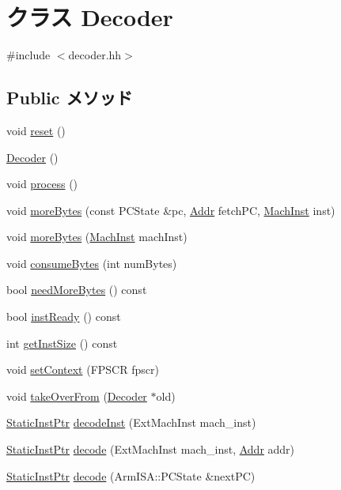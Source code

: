 \hypertarget{classArmISA_1_1Decoder}{
\section{クラス Decoder}
\label{classArmISA_1_1Decoder}
}


{\ttfamily \#include $<$decoder.hh$>$}\subsection*{Public メソッド}
\begin{DoxyCompactItemize}
\item 
void \hyperlink{classArmISA_1_1Decoder_ad20897c5c8bd47f5d4005989bead0e55}{reset} ()
\item 
\hyperlink{classArmISA_1_1Decoder_aedfa2b7d97ed17b14903ed75d6214c78}{Decoder} ()
\item 
void \hyperlink{classArmISA_1_1Decoder_a2e9c5136d19b1a95fc427e0852deab5c}{process} ()
\item 
void \hyperlink{classArmISA_1_1Decoder_a85a99c8dd9425508bee9a17836dbbd12}{moreBytes} (const PCState \&pc, \hyperlink{classm5_1_1params_1_1Addr}{Addr} fetchPC, \hyperlink{namespaceArmISA_a301c22ea09fa33dcfe6ddf22f203699c}{MachInst} inst)
\item 
void \hyperlink{classArmISA_1_1Decoder_ad64ff6faaad6c993e98f9c2bcbf25f0e}{moreBytes} (\hyperlink{namespaceArmISA_a301c22ea09fa33dcfe6ddf22f203699c}{MachInst} machInst)
\item 
void \hyperlink{classArmISA_1_1Decoder_a34f1e4d13220afca8ec5c23596daba7e}{consumeBytes} (int numBytes)
\item 
bool \hyperlink{classArmISA_1_1Decoder_ac858279e4cc89d892ea4cb6b42853d88}{needMoreBytes} () const 
\item 
bool \hyperlink{classArmISA_1_1Decoder_aff34b6a32f7726d46b66dd672105c900}{instReady} () const 
\item 
int \hyperlink{classArmISA_1_1Decoder_a55ee00e46b2bd37b77e07a2ccd69eafe}{getInstSize} () const 
\item 
void \hyperlink{classArmISA_1_1Decoder_a8cecf05175fd0678cf9a71177c52839f}{setContext} (FPSCR fpscr)
\item 
void \hyperlink{classArmISA_1_1Decoder_a83393f90e7cbd98eda9721ba6022d0e0}{takeOverFrom} (\hyperlink{classArmISA_1_1Decoder}{Decoder} $\ast$old)
\item 
\hyperlink{classRefCountingPtr}{StaticInstPtr} \hyperlink{classArmISA_1_1Decoder_a148768e0e9062eb41f604040d0ea86e6}{decodeInst} (ExtMachInst mach\_\-inst)
\item 
\hyperlink{classRefCountingPtr}{StaticInstPtr} \hyperlink{classArmISA_1_1Decoder_a4ed948f8d08575cc2916fe32154ea69d}{decode} (ExtMachInst mach\_\-inst, \hyperlink{classm5_1_1params_1_1Addr}{Addr} addr)
\item 
\hyperlink{classRefCountingPtr}{StaticInstPtr} \hyperlink{classArmISA_1_1Decoder_a516800185e8fbc3dd35db10f0c02ba9e}{decode} (ArmISA::PCState \&nextPC)
\end{DoxyCompactItemize}
